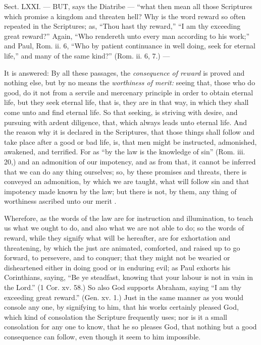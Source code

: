 
Sect. LXXI. — BUT, says the Diatribe — “what then mean all those Scriptures which promise a kingdom and threaten hell? Why is the word reward so often repeated in the Scriptures; as, “Thou hast thy reward,” “I am thy exceeding great reward?” Again, “Who rendereth unto every man according to his work;” and Paul, Rom. ii. 6, “Who by patient continuance in well doing, seek for eternal life,” and many of the same kind?” (Rom. ii. 6, 7.) —

It is answered: By all these passages, the \emph{consequence of reward }is proved and nothing else, but by no means the \emph{worthiness of merit: }seeing that, those who do good, do it not from a servile and mercenary principle in order to obtain eternal life, but they seek eternal life, that is, they are in that way, in which they shall come unto and find eternal life. So that seeking, is striving with desire, and pursuing with ardent diligence, that, which always leads unto eternal life. And the reason why it is declared in the Scriptures, that those things shall follow and take place after a good or bad life, is, that men might be instructed, admonished, awakened, and terrified. For as “by the law is the knowledge of sin” (Rom. iii. 20,) and an admonition of our impotency, and as from that, it cannot be inferred that we can do any thing ourselves; so, by these promises and threats, there is conveyed an admonition, by which we are taught, what will follow sin and that impotency made known by the law; but there is not, by them, any thing of worthiness ascribed unto our merit .

Wherefore, as the words of the law are for instruction and illumination, to teach us what we ought to do, and also what we are not able to do; so the words of reward, while they signify what will be hereafter, are for exhortation and threatening, by which the just are animated, comforted, and raised up to go forward, to persevere, and to conquer; that they might not be wearied or disheartened either in doing good or in enduring evil; as Paul exhorts his Corinthians, saying, “Be ye steadfast, knowing that your labour is not in vain in the Lord.” (1 Cor. xv. 58.) So also God supports Abraham, saying “I am thy exceeding great reward.” (Gen. xv. 1.) Just in the same manner as you would console any one, by signifying to him, that his works certainly pleased God, which kind of consolation the Scripture frequently uses; nor is it a small consolation for any one to know, that he so pleases God, that nothing but a good consequence can follow, even though it seem to him impossible.

